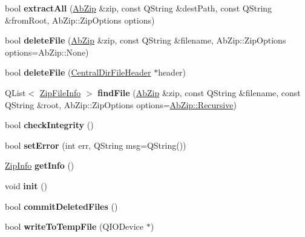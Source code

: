 \begin{DoxyCompactItemize}
\item 
bool {\bfseries extract\+All} (\hyperlink{class_ab_zip}{Ab\+Zip} \&zip, const Q\+String \&dest\+Path, const Q\+String \&from\+Root, Ab\+Zip\+::\+Zip\+Options options)\hypertarget{class_ab_zip_private_abe875a91034b5744b919ebc677369867}{}\label{class_ab_zip_private_abe875a91034b5744b919ebc677369867}

\item 
bool {\bfseries delete\+File} (\hyperlink{class_ab_zip}{Ab\+Zip} \&zip, const Q\+String \&filename, Ab\+Zip\+::\+Zip\+Options options=Ab\+Zip\+::\+None)\hypertarget{class_ab_zip_private_a735b7def1d063f36f81ee54ef1f0f56e}{}\label{class_ab_zip_private_a735b7def1d063f36f81ee54ef1f0f56e}

\item 
bool {\bfseries delete\+File} (\hyperlink{class_central_dir_file_header}{Central\+Dir\+File\+Header} $\ast$header)\hypertarget{class_ab_zip_private_ad07f6a206e914ed0126a41647dc89c61}{}\label{class_ab_zip_private_ad07f6a206e914ed0126a41647dc89c61}

\item 
Q\+List$<$ \hyperlink{class_zip_file_info}{Zip\+File\+Info} $>$ {\bfseries find\+File} (\hyperlink{class_ab_zip}{Ab\+Zip} \&zip, const Q\+String \&filename, const Q\+String \&root, Ab\+Zip\+::\+Zip\+Options options=\hyperlink{class_ab_zip_a9c4f57d6b8d9a449c2eb6c4d4e53c9d5a23555db8b40ecaf3966a205023b515e3}{Ab\+Zip\+::\+Recursive})\hypertarget{class_ab_zip_private_a0c941854749d649ec045fd9690e2938b}{}\label{class_ab_zip_private_a0c941854749d649ec045fd9690e2938b}

\item 
bool {\bfseries check\+Integrity} ()\hypertarget{class_ab_zip_private_abb0e34d340acbbf877069c5db214b516}{}\label{class_ab_zip_private_abb0e34d340acbbf877069c5db214b516}

\item 
bool {\bfseries set\+Error} (int err, Q\+String msg=Q\+String())\hypertarget{class_ab_zip_private_a75ddc3019dc240c024c69f2782b3e2f5}{}\label{class_ab_zip_private_a75ddc3019dc240c024c69f2782b3e2f5}

\item 
\hyperlink{class_zip_info}{Zip\+Info} {\bfseries get\+Info} ()\hypertarget{class_ab_zip_private_adb07787f8d2a739dd1146b6914c941ec}{}\label{class_ab_zip_private_adb07787f8d2a739dd1146b6914c941ec}

\item 
void {\bfseries init} ()\hypertarget{class_ab_zip_private_a1ad0da6e65d6e48f075bd1c29368203b}{}\label{class_ab_zip_private_a1ad0da6e65d6e48f075bd1c29368203b}

\item 
bool {\bfseries commit\+Deleted\+Files} ()\hypertarget{class_ab_zip_private_a16c9aacaa32463322d5cea272c82d06f}{}\label{class_ab_zip_private_a16c9aacaa32463322d5cea272c82d06f}

\item 
bool {\bfseries write\+To\+Temp\+File} (Q\+I\+O\+Device $\ast$)\hypertarget{class_ab_zip_private_a781dcdeee540e1d325e286a3e32b6b34}{}\label{class_ab_zip_private_a781dcdeee540e1d325e286a3e32b6b34}

\end{DoxyCompactItemize}
